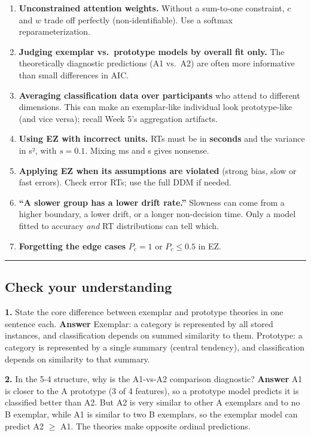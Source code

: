 \begin{enumerate}
\def\labelenumi{\arabic{enumi}.}
\tightlist
\item
  \textbf{Unconstrained attention weights.} Without a sum-to-one
  constraint, \(c\) and \(w\) trade off perfectly (non-identifiable).
  Use a softmax reparameterization.
\item
  \textbf{Judging exemplar vs.~prototype models by overall fit only.}
  The theoretically diagnostic predictions (A1 vs.~A2) are often more
  informative than small differences in AIC.
\item
  \textbf{Averaging classification data over participants} who attend to
  different dimensions. This can make an exemplar-like individual look
  prototype-like (and vice versa); recall Week 5's aggregation
  artifacts.
\item
  \textbf{Using EZ with incorrect units.} RTs must be in
  \textbf{seconds} and the variance in s², with \(s = 0.1\). Mixing ms
  and s gives nonsense.
\item
  \textbf{Applying EZ when its assumptions are violated} (strong bias,
  slow or fast errors). Check error RTs; use the full DDM if needed.
\item
  \textbf{``A slower group has a lower drift rate.''} Slowness can come
  from a higher boundary, a lower drift, or a longer non-decision time.
  Only a model fitted to accuracy \emph{and} RT distributions can tell
  which.
\item
  \textbf{Forgetting the edge cases} \(P_c = 1\) or \(P_c \le 0.5\) in
  EZ.
\end{enumerate}

\begin{center}\rule{0.5\linewidth}{0.5pt}\end{center}

\subsection{Check your understanding}

\textbf{1.} State the core difference between exemplar and prototype
theories in one sentence each. \textbf{Answer} Exemplar: a category is
represented by all stored instances, and classification depends on
summed similarity to them. Prototype: a category is represented by a
single summary (central tendency), and classification depends on
similarity to that summary.

\textbf{2.} In the 5-4 structure, why is the A1-vs-A2 comparison
diagnostic? \textbf{Answer} A1 is closer to the A prototype (3 of 4
features), so a prototype model predicts it is classified better than
A2. But A2 is very similar to other A exemplars and to no B exemplar,
while A1 is similar to two B exemplars, so the exemplar model can
predict A2 \ensuremath{\geq} A1. The theories make opposite ordinal predictions.

